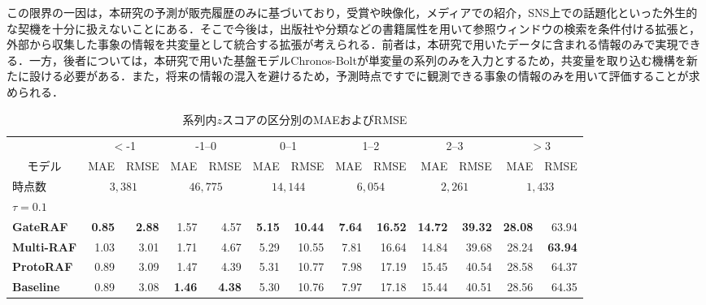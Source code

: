 \documentclass[twocolumn, lastpage]{jarticle}
\newif\ifrevmark
\newcommand{\revA}[1]{\ifrevmark{\color{blue}#1}\else#1\fi}
\newcommand{\revB}[1]{\ifrevmark{\color{red}#1}\else#1\fi}
\newcommand{\revAcolor}{\ifrevmark\color{blue}\fi}
\newcommand{\revBcolor}{\ifrevmark\color{red}\fi}
\begin{document}
\revA{この限界の一因は，本研究の予測が販売履歴のみに基づいており，受賞や映像化，メディアでの紹介，SNS上での話題化といった外生的な契機を十分に扱えないことにある．そこで今後は，出版社や分類などの書籍属性を用いて参照ウィンドウの検索を条件付ける拡張と，外部から収集した事象の情報を共変量として統合する拡張が考えられる．前者は，本研究で用いたデータに含まれる情報のみで実現できる．一方，後者については，本研究で用いた基盤モデルChronos-Boltが単変量の系列のみを入力とするため，共変量を取り込む機構を新たに設ける必要がある．また，将来の情報の混入を避けるため，予測時点ですでに観測できる事象の情報のみを用いて評価することが求められる．}

    \begin{table}[t]
    \revAcolor
    \caption{系列内$z$スコアの区分別のMAEおよびRMSE}
    \label{tab:mae_rmse_vs_zscore}
    \centering
    \setlength{\tabcolsep}{3pt}%
    \begin{tabular}{lrrrrrrrrrrrr}
    \hline
     & \multicolumn{2}{c}{$<$-1} & \multicolumn{2}{c}{-1--0} & \multicolumn{2}{c}{0--1} & \multicolumn{2}{c}{1--2} & \multicolumn{2}{c}{2--3} & \multicolumn{2}{c}{$>$3} \\
    \cline{2-13}
    \multicolumn{1}{c}{モデル} & MAE & RMSE & MAE & RMSE & MAE & RMSE & MAE & RMSE & MAE & RMSE & MAE & RMSE \\
    \hline\hline
    \revB{時点数} & \multicolumn{2}{c}{\revBcolor $3{,}381$} & \multicolumn{2}{c}{\revBcolor $46{,}775$} & \multicolumn{2}{c}{\revBcolor $14{,}144$} & \multicolumn{2}{c}{\revBcolor $6{,}054$} & \multicolumn{2}{c}{\revBcolor $2{,}261$} & \multicolumn{2}{c}{\revBcolor $1{,}433$} \\
    \hline
    \multicolumn{13}{l}{$\tau=0.1$} \\
    \quad \textbf{GateRAF} & \textbf{0.85} & \textbf{2.88} & 1.57 & 4.57 & \textbf{5.15} & \textbf{10.44} & \textbf{7.64} & \textbf{16.52} & \textbf{14.72} & \textbf{39.32} & \textbf{28.08} & 63.94 \\
    \quad \textbf{Multi-RAF} & 1.03 & 3.01 & 1.71 & 4.67 & 5.29 & 10.55 & 7.81 & 16.64 & 14.84 & 39.68 & 28.24 & \textbf{63.94} \\
    \quad \textbf{ProtoRAF} & 0.89 & 3.09 & 1.47 & 4.39 & 5.31 & 10.77 & 7.98 & 17.19 & 15.45 & 40.54 & 28.58 & 64.37 \\
    \quad \textbf{Baseline} & 0.89 & 3.08 & \textbf{1.46} & \textbf{4.38} & 5.30 & 10.76 & 7.97 & 17.18 & 15.44 & 40.51 & 28.56 & 64.35 \\

\end{tabular}
\end{table}
\end{document}
